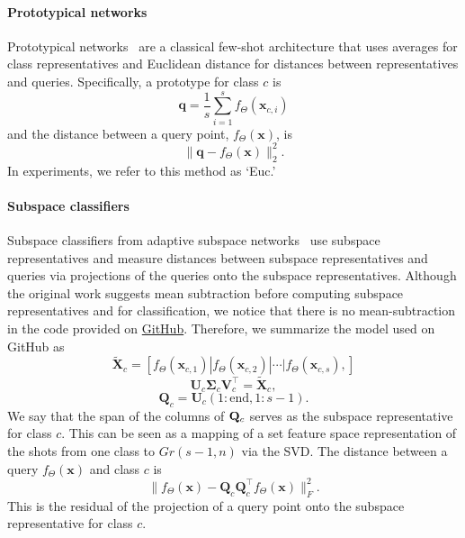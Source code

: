 \paragraph{Prototypical networks}
Prototypical networks~\cite{snell2017prototypical} are a classical few-shot architecture that uses averages for class representatives and Euclidean distance for distances between representatives and queries. Specifically, a prototype for class $c$ is
\begin{equation}
    \mathbf{q} = \frac{1}{s} \sum_{i=1}^s f_\Theta(\bm{x}_{c,i})
\end{equation}
and the distance between a query point, $f_{\Theta}(\bm{x})$, is
\begin{equation}
    \|\mathbf{q} - f_{\Theta}(\bm{x})\|_2^2.
\end{equation}
In experiments, we refer to this method as `Euc.'


\paragraph{Subspace classifiers}
Subspace classifiers from adaptive subspace networks~\cite{simon2020adaptive} use subspace representatives and measure distances between subspace representatives and queries via projections of the queries onto the subspace representatives. Although the original work suggests mean subtraction before computing subspace representatives and for classification, we notice that there is no mean-subtraction in the code provided on \href{https://github.com/chrysts/dsn_fewshot/blob/master/Resnet12/models/classification_heads.py}{GitHub}. Therefore, we summarize the model used on GitHub as
\begin{equation}
    \tilde{\bm{X}}_c = \left[ f_\Theta(\bm{x}_{c,1})|f_\Theta(\bm{x}_{c,2})|\cdots| f_\Theta(\bm{x}_{c,s}) ,\right]
\end{equation}
\begin{equation}
    \mathbf{U}_c \boldsymbol{\Sigma}_c \mathbf{V}_c^\top = \tilde{\bm{X}}_c,
\end{equation}
\begin{equation}
    \mathbf{Q}_c = \mathbf{U}_c(1:\mathrm{end},1:s-1).
\end{equation}
We say that the span of the columns of $\mathbf{Q}_c$ serves as the subspace representative for class $c$. This can be seen as a mapping of a set feature space representation of the shots from one class to $Gr(s-1,n)$ via the SVD. The distance between a query $f_{\Theta}(\bm{x})$ and class $c$ is 
\begin{equation}
    \|f_{\Theta}(\bm{x}) - \mathbf{Q}_c \mathbf{Q}_c^\top f_{\Theta}(\bm{x})\|_F^2.
\end{equation}
This is the residual of the projection of a query point onto the subspace representative for class $c$.

